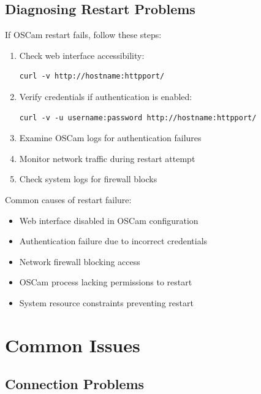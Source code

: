 \documentclass[a4paper,11pt]{report}
\begin{document}
\subsection{Diagnosing Restart Problems}
\begin{procedurebox}
If OSCam restart fails, follow these steps:
\begin{enumerate}
    \item Check web interface accessibility:
    \begin{verbatim}
curl -v http://hostname:httpport/
    \end{verbatim}
    \item Verify credentials if authentication is enabled:
    \begin{verbatim}
curl -v -u username:password http://hostname:httpport/
    \end{verbatim}
    \item Examine OSCam logs for authentication failures
    \item Monitor network traffic during restart attempt
    \item Check system logs for firewall blocks
\end{enumerate}
\end{procedurebox}

\begin{warningbox}
Common causes of restart failure:
\begin{itemize}
    \item Web interface disabled in OSCam configuration
    \item Authentication failure due to incorrect credentials
    \item Network firewall blocking access
    \item OSCam process lacking permissions to restart
    \item System resource constraints preventing restart
\end{itemize}
\end{warningbox}

\section{Common Issues}

\subsection{Connection Problems}
\end{document}
